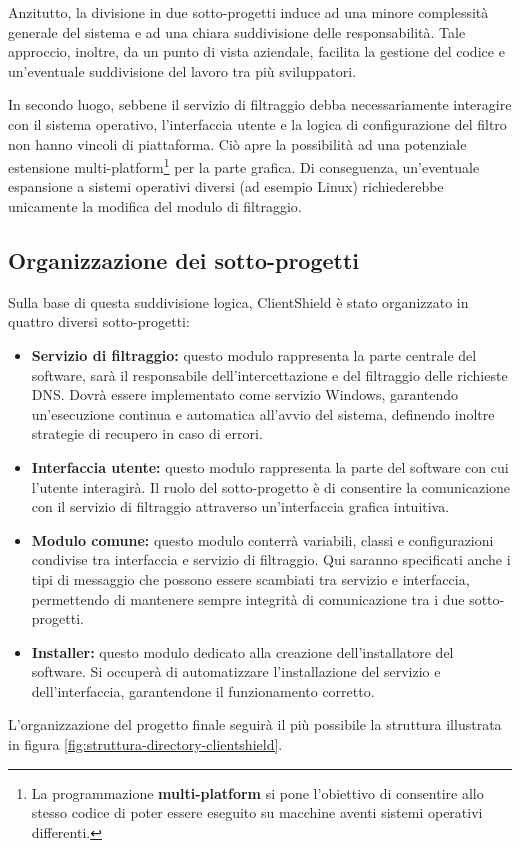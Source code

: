 \documentclass[12pt,a4paper,openright,twoside]{book}
\begin{document}
Anzitutto, la divisione in due sotto-progetti induce ad una minore complessità generale del sistema e ad una chiara suddivisione delle responsabilità.
Tale approccio, inoltre, da un punto di vista aziendale, facilita la gestione del codice e un'eventuale suddivisione del lavoro tra più sviluppatori.

In secondo luogo, sebbene il servizio di filtraggio debba necessariamente interagire con il sistema operativo, l'interfaccia utente e la logica di configurazione del filtro non hanno vincoli di piattaforma.
Ciò apre la possibilità ad una potenziale estensione multi-platform\footnote{La programmazione \textbf{multi-platform} si pone l'obiettivo di consentire allo stesso codice di poter essere eseguito su macchine aventi sistemi operativi differenti.} per la parte grafica.
Di conseguenza, un'eventuale espansione a sistemi operativi diversi (ad esempio Linux) richiederebbe unicamente la modifica del modulo di filtraggio.

\subsection{Organizzazione dei sotto-progetti}

Sulla base di questa suddivisione logica, ClientShield è stato organizzato in quattro diversi sotto-progetti:

\begin{itemize}
	\item \textbf{Servizio di filtraggio:}
	questo modulo rappresenta la parte centrale del software, sarà il responsabile dell'intercettazione e del filtraggio delle richieste \gls{DNS}.
	Dovrà essere implementato come servizio Windows, garantendo un'esecuzione continua e automatica all'avvio del sistema, definendo inoltre strategie di recupero in caso di errori.
	
	\item \textbf{Interfaccia utente:}
	questo modulo rappresenta la parte del software con cui l'utente interagirà.
	Il ruolo del sotto-progetto è di consentire la comunicazione con il servizio di filtraggio attraverso un'interfaccia grafica intuitiva.
	
	\item \textbf{Modulo comune:}
	questo modulo conterrà variabili, classi e configurazioni condivise tra interfaccia e servizio di filtraggio.
	Qui saranno specificati anche i tipi di messaggio che possono essere scambiati tra servizio e interfaccia, permettendo di mantenere sempre integrità di comunicazione tra i due sotto-progetti.
	
	\item \textbf{Installer:}
	questo modulo dedicato alla creazione dell'installatore del software.
	Si occuperà di automatizzare l'installazione del servizio e dell'interfaccia, garantendone il funzionamento corretto.
\end{itemize}
L'organizzazione del progetto finale seguirà il più possibile la struttura illustrata in figura \ref{fig:struttura-directory-clientshield}.
\end{document}
